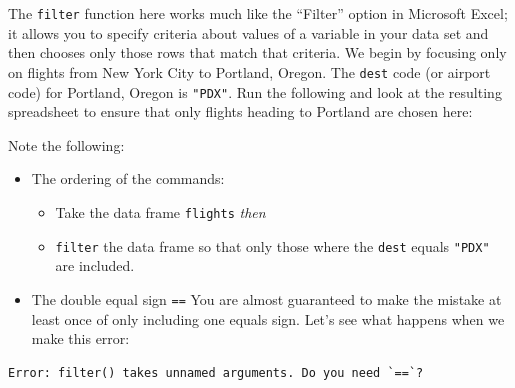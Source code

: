 \documentclass[]{tufte-book}
\newenvironment{Shaded}{\begin{snugshade}}{\end{snugshade}}
\newcommand{\KeywordTok}[1]{\textcolor[rgb]{0.13,0.29,0.53}{\textbf{{#1}}}}
\newcommand{\DataTypeTok}[1]{\textcolor[rgb]{0.13,0.29,0.53}{{#1}}}
\newcommand{\StringTok}[1]{\textcolor[rgb]{0.31,0.60,0.02}{{#1}}}
\newcommand{\NormalTok}[1]{{#1}}
\providecommand{\tightlist}{%
  \setlength{\itemsep}{0pt}\setlength{\parskip}{0pt}}
\theoremstyle{definition}
\theoremstyle{definition}
\theoremstyle{remark}
\begin{document}
The \texttt{filter} function here works much like the ``Filter'' option
in Microsoft Excel; it allows you to specify criteria about values of a
variable in your data set and then chooses only those rows that match
that criteria. We begin by focusing only on flights from New York City
to Portland, Oregon. The \texttt{dest} code (or airport code) for
Portland, Oregon is \texttt{"PDX"}. Run the following and look at the
resulting spreadsheet to ensure that only flights heading to Portland
are chosen here:

\begin{Shaded}
\end{Shaded}

Note the following:

\begin{itemize}
\tightlist
\item
  The ordering of the commands:

  \begin{itemize}
  \tightlist
  \item
    Take the data frame \texttt{flights} \emph{then}
  \item
    \texttt{filter} the data frame so that only those where the
    \texttt{dest} equals \texttt{"PDX"} are included.
  \end{itemize}
\item
  The double equal sign \texttt{==} You are almost guaranteed to make
  the mistake at least once of only including one equals sign. Let's see
  what happens when we make this error:
\end{itemize}

\begin{Shaded}
\end{Shaded}

\begin{verbatim}
Error: filter() takes unnamed arguments. Do you need `==`?
\end{verbatim}
\end{document}

